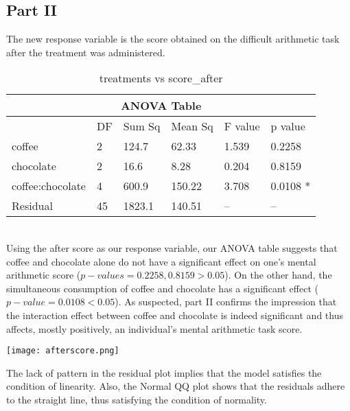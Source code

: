 \documentclass[12pt]{article}
\begin{document}
\begin{flushleft}
\subsection{Part II}
\bigskip
The new response variable is the score obtained on the difficult arithmetic task after the treatment was administered.
\begin{table}[h]
\caption{treatments vs score\_after}
\begin{tabular}{ |p{3cm}|p{2cm}|p{2cm}|p{2cm}|p{2cm}|p{2cm}| }
 \hline
 \multicolumn{6}{|c|}{ANOVA Table} \\
 \hline
  & DF & Sum Sq & Mean Sq & F value & p value\\
 \hline
coffee   & 2  & 124.7 & 62.33 & 1.539 & 0.2258 \\
chocolate  & 2 & 16.6 & 8.28 & 0.204 & 0.8159\\
coffee:chocolate & 4 & 600.9 & 150.22 & 3.708 &0.0108 *\\
Residual & 45 & 1823.1 & 140.51 & -- & --\\
 \hline
\end{tabular}
\end{table}
\\ Using the after score as our response variable, our ANOVA table suggests that coffee and chocolate alone do not have a significant effect on one\rq s mental arithmetic score ($p-values = 0.2258, 0.8159 > 0.05$). On the other hand, the simultaneous consumption of coffee and chocolate has a significant effect ($p-value = 0.0108 < 0.05$). As suspected, part II confirms the impression that the interaction effect between coffee and chocolate is indeed significant and thus affects, mostly positively, an individual's mental arithmetic task score.
\begin{center}
\texttt{[image: afterscore.png]}
\end{center}
The lack of pattern in the residual plot implies that the model satisfies the condition of linearity. Also, the Normal QQ plot shows that the residuals adhere to the straight line, thus satisfying the condition of normality.
\bigskip

\end{flushleft}
\end{document}

